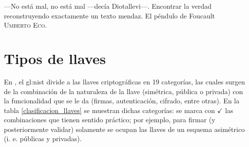 %
%

{
  \epigrafe
  {%
    ---No está mal, no está mal ---decía Diotallevi---. Encontrar la verdad
    reconstruyendo exactamente un texto mendaz.%
  }
  {%
    El péndulo de Foucault \\
    \textsc{Umberto Eco}.%
  }
}


\section{Tipos de llaves}

En \cite{nist_llaves}, el \gls{gl:nist} divide a las llaves criptográficas en
19 categorías, las cuales surgen de la combinación de la naturaleza de la
llave (simétrica, pública o privada) con la funcionalidad que se le da
(firmas, autenticación, cifrado, entre otras). En la tabla
\ref{clasificacion_llaves} se muestran dichas categorías: se marca con
$ \checkmark $ las combinaciones que tienen sentido práctico; por ejemplo, para
firmar (y posteriormente validar) solamente se ocupan las llaves de un esquema
asimétrico (i. e. públicas y privadas).

